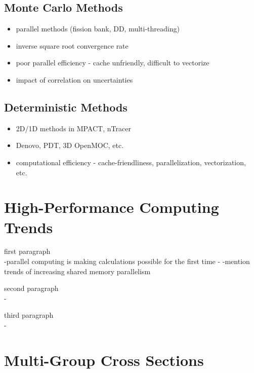 \subsection{Monte Carlo Methods}
\label{subsec:chap1-monte-carlo}

\begin{itemize}[noitemsep]
  \item parallel methods (fission bank, DD, multi-threading)
  \item inverse square root convergence rate
  \item poor parallel efficiency - cache unfriendly, difficult to vectorize
  \item impact of correlation on uncertainties
\end{itemize}


\subsection{Deterministic Methods}
\label{subsec:chap1-deterministic}


\begin{itemize}[noitemsep]
  \item 2D/1D methods in MPACT, nTracer
  \item Denovo, PDT, 3D OpenMOC, etc.
  \item computational efficiency - cache-friendliness, parallelization, vectorization, etc.
\end{itemize}


\section{High-Performance Computing Trends}
\label{sec:chap1-hpc-trends}

first paragraph\\
-parallel computing is making calculations possible for the first time
-
-mention trends of increasing shared memory parallelism

second paragraph\\
-

third paragraph\\
-


\section{Multi-Group Cross Sections}
\label{sec:chap1-mgxs}

